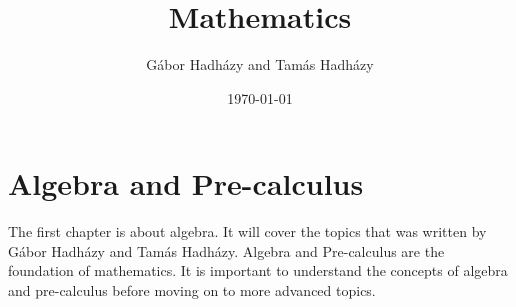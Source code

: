 \documentclass[a4paper,12pt]{book}
\author{Gábor Hadházy and Tamás Hadházy}
\title{Mathematics}
\date{\today}
\begin{document}
\maketitle

\tableofcontents

\chapter{Algebra and Pre-calculus}
The first chapter is about algebra. It will cover the topics that was written by Gábor Hadházy and Tamás Hadházy. Algebra and Pre-calculus are the foundation of mathematics. It is important to understand the concepts of algebra and pre-calculus before moving on to more advanced topics.

\end{document}
